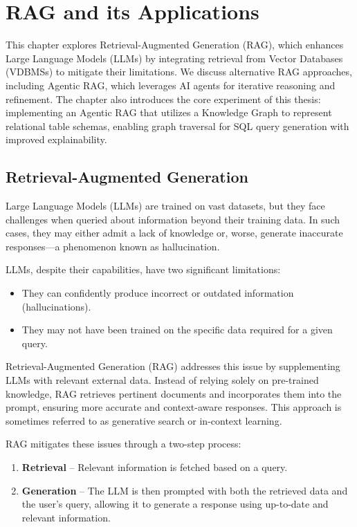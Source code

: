 \pagestyle{fancy}
\chapter{RAG and its Applications}  
\label{chap:RAG}  
This chapter explores Retrieval-Augmented Generation (RAG), which enhances Large Language Models (LLMs) by integrating retrieval from Vector Databases (VDBMSs) to mitigate their limitations. We discuss alternative RAG approaches, including Agentic RAG, which leverages AI agents for iterative reasoning and refinement. The chapter also introduces the core experiment of this thesis: implementing an Agentic RAG that utilizes a Knowledge Graph to represent relational table schemas, enabling graph traversal for SQL query generation with improved explainability.  


\section{Retrieval-Augmented Generation}  
Large Language Models (LLMs) are trained on vast datasets, but they face challenges when queried about information beyond their training data. In such cases, they may either admit a lack of knowledge or, worse, generate inaccurate responses—a phenomenon known as hallucination. 

LLMs, despite their capabilities, have two significant limitations:  
\begin{itemize}  
    \item They can confidently produce incorrect or outdated information (hallucinations).  
    \item They may not have been trained on the specific data required for a given query.  
\end{itemize}  


Retrieval-Augmented Generation (RAG) addresses this issue by supplementing LLMs with relevant external data. Instead of relying solely on pre-trained knowledge, RAG retrieves pertinent documents and incorporates them into the prompt, ensuring more accurate and context-aware responses. This approach is sometimes referred to as generative search or in-context learning.  

RAG mitigates these issues through a two-step process:  
\begin{enumerate}  
    \item \textbf{Retrieval} – Relevant information is fetched based on a query.  
    \item \textbf{Generation} – The LLM is then prompted with both the retrieved data and the user's query, allowing it to generate a response using up-to-date and relevant information.  
\end{enumerate}  

